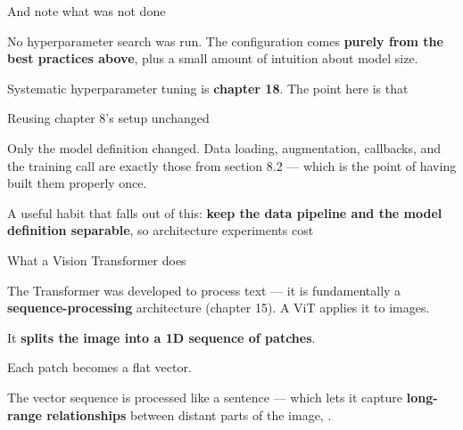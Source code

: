 \documentclass[aspectratio=169,11pt,t]{beamer}
\begin{document}
\begin{frame}[shrink=25]{And note what was not done}
{\fontsize{9.4}{12.6}\selectfont\color{fg2}No hyperparameter search was run. The configuration comes \textbf{purely from the best practices above}, plus a small amount of intuition about model size.\par}\vskip 4pt
\begin{iband}[signal]
Systematic hyperparameter tuning is \textbf{chapter 18}. The point here is that 
\end{iband}
\end{frame}

\begin{frame}[shrink=25]{Reusing chapter 8's setup unchanged}
{\fontsize{9.4}{12.6}\selectfont\color{fg2}Only the model definition changed. Data loading, augmentation, callbacks, and the training call are exactly those from section 8.2 --- which is the point of having built them properly once.\par}\vskip 4pt
\begin{iband}[signal]
A useful habit that falls out of this: \textbf{keep the data pipeline and the model definition separable}, so architecture experiments cost 
\end{iband}
\end{frame}


\begin{frame}[shrink=25]{What a Vision Transformer does}
{\fontsize{9.4}{12.6}\selectfont\color{fg2}The Transformer was developed to process text --- it is fundamentally a \textbf{sequence-processing} architecture (chapter 15). A ViT applies it to images.\par}\vskip 4pt
\begin{ibullets}
\item It \textbf{splits the image into a 1D sequence of patches}.
\item Each patch becomes a flat vector.
\item The vector sequence is processed like a sentence --- which lets it capture \textbf{long-range relationships} between distant parts of the image, .
\end{ibullets}
\end{frame}
\end{document}
